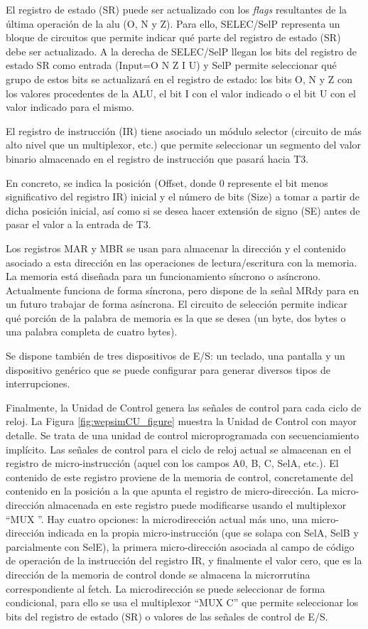 El registro de estado (SR) puede ser actualizado con los \emph{flags} resultantes de la última operación de la alu (O, N y Z). Para ello, SELEC/SelP representa un bloque de circuitos que permite indicar qué parte del registro de estado (SR) debe ser actualizado. A la derecha de SELEC/SelP llegan los bits del registro de estado SR como entrada (Input=O N Z I U) y SelP permite seleccionar qué grupo de estos bits se actualizará en el registro de estado: los bits O, N y Z con los valores procedentes de la ALU, el bit I con el valor indicado o el bit U con el valor indicado para el mismo.

El registro de instrucción (IR) tiene asociado un módulo selector (circuito de  más alto nivel que un multiplexor, etc.) que permite seleccionar un segmento del valor binario almacenado en el registro de instrucción que pasará hacia T3.

En concreto, se indica la posición (Offset, donde 0 represente el bit menos significativo del registro IR) inicial y el número de bits (Size) a tomar a partir de dicha posición inicial, así como si se desea hacer extensión de signo (SE) antes de pasar el valor a la entrada de T3.

Los registros MAR y MBR se usan para almacenar la dirección y el contenido asociado a esta dirección en las operaciones de lectura/escritura con la memoria. La memoria está diseñada para un funcionamiento síncrono o asíncrono. Actualmente funciona de forma síncrona, pero dispone de la señal MRdy para en un futuro trabajar de forma asíncrona. El circuito de selección permite indicar qué porción de la palabra de memoria es la que se desea (un byte, dos bytes o una palabra completa de cuatro bytes).

Se dispone también de tres dispositivos de E/S: un teclado, una pantalla y un dispositivo genérico que se puede configurar para generar diversos tipos de interrupciones.

Finalmente, la Unidad de Control genera las señales de control para cada ciclo de reloj. La Figura \ref{fig:wepsimCU_figure} muestra la Unidad de Control con mayor detalle. Se trata de una unidad de control microprogramada con secuenciamiento implícito. Las señales de control para el ciclo de reloj actual se almacenan en el registro de micro-instrucción (aquel con los campos A0, B, C, SelA, etc.). El contenido de este registro proviene de la memoria de control, concretamente del contenido en la posición a la que apunta el registro de micro-dirección. La micro-dirección almacenada en este registro puede modificarse usando el multiplexor ``MUX ''. Hay cuatro opciones: la microdirección actual más uno, una micro-dirección indicada en la propia micro-instrucción (que se solapa con SelA, SelB y parcialmente con SelE), la primera micro-dirección asociada al campo de código de operación de la instrucción del registro IR, y finalmente el valor cero, que es la dirección de la memoria de control donde se almacena la microrrutina correspondiente al fetch. La microdirección se puede seleccionar de forma condicional, para ello se usa el multiplexor ``MUX C'' que permite seleccionar los bits del registro de estado (SR) o valores de las señales de control de E/S.

